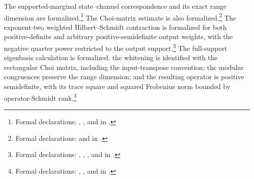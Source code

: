 \documentclass[11pt]{article}
\begin{document}
The supported-marginal state--channel correspondence and its exact range
dimension are formalized.\footnote{Formal declarations:
,
, and
 in
.}
The Choi-matrix estimate is also formalized.\footnote{Formal declarations:
 and
 in
.}
The exponent-two weighted Hilbert--Schmidt contraction is formalized for both
positive-definite and arbitrary positive-semidefinite output weights, with the
negative quarter power restricted to the output support.\footnote{Formal
declarations:
,
,
, and
in .}
The full-support eigenbasis calculation is formalized: the whitening is
identified with the rectangular Choi matrix, including the input-transpose
convention; the modular congruences preserve the range dimension; and the
resulting operator is positive semidefinite, with its trace square and squared
Frobenius norm bounded by operator-Schmidt rank.\footnote{Formal declarations:
,
, and
in .}
\end{document}
